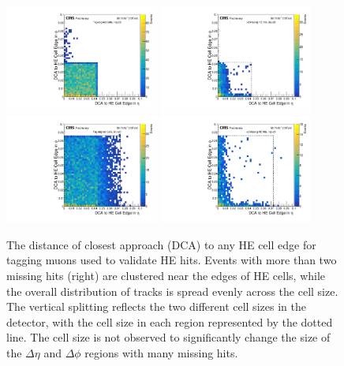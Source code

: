 \begin{figure}[htbp]
	\centering
	\includegraphics[width=0.45\textwidth]{figures/HEEdgeDistance_all_smallCell.pdf}
        \hspace{0.01\textwidth}
        \includegraphics[width=0.45\textwidth]{figures/HEEdgeDistance_multMissing_smallCell.pdf}
	\includegraphics[width=0.45\textwidth]{figures/HEEdgeDistance_all.pdf}
        \hspace{0.01\textwidth}
        \includegraphics[width=0.45\textwidth]{figures/HEEdgeDistance_multMissing.pdf}

        \caption[Muon distances to HE cell edges]{The distance of closest approach (DCA) to any HE cell edge for tagging muons used to validate HE hits. Events with more than two missing hits (right) are clustered near the edges of HE cells, while the overall distribution of tracks is spread evenly across the cell size. The vertical splitting reflects the two different cell sizes in the detector, with the cell size in each region represented by the dotted line. The cell size is not observed to significantly change the size of the $\Delta\eta$ and $\Delta\phi$ regions with many missing hits.}
        \label{fig:cellEdges}
\end{figure}

